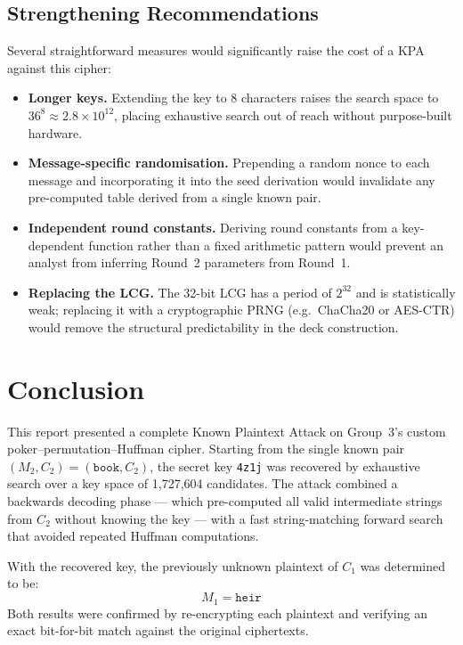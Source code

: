 \documentclass[12pt,a4paper]{article}
\begin{document}
\subsection{Strengthening Recommendations}

Several straightforward measures would significantly raise the cost of a KPA against this cipher:

\begin{itemize}[noitemsep]
    \item \textbf{Longer keys.} Extending the key to 8 characters raises the search space to $36^8 \approx 2.8 \times 10^{12}$, placing exhaustive search out of reach without purpose-built hardware.
    \item \textbf{Message-specific randomisation.} Prepending a random nonce to each message and incorporating it into the seed derivation would invalidate any pre-computed table derived from a single known pair.
    \item \textbf{Independent round constants.} Deriving round constants from a key-dependent function rather than a fixed arithmetic pattern would prevent an analyst from inferring Round~2 parameters from Round~1.
    \item \textbf{Replacing the LCG.} The 32-bit LCG has a period of $2^{32}$ and is statistically weak; replacing it with a cryptographic PRNG (e.g.\ ChaCha20 or AES-CTR) would remove the structural predictability in the deck construction.
\end{itemize}

\section{Conclusion}

This report presented a complete Known Plaintext Attack on Group~3's custom poker–permutation–Huffman cipher. Starting from the single known pair $(M_2, C_2) = (\texttt{book}, C_2)$, the secret key \texttt{4z1j} was recovered by exhaustive search over a key space of 1,727,604 candidates. The attack combined a backwards decoding phase — which pre-computed all valid intermediate strings from $C_2$ without knowing the key — with a fast string-matching forward search that avoided repeated Huffman computations.

With the recovered key, the previously unknown plaintext of $C_1$ was determined to be:
\[
    \boxed{M_1 = \texttt{heir}}
\]
Both results were confirmed by re-encrypting each plaintext and verifying an exact bit-for-bit match against the original ciphertexts.
\end{document}
